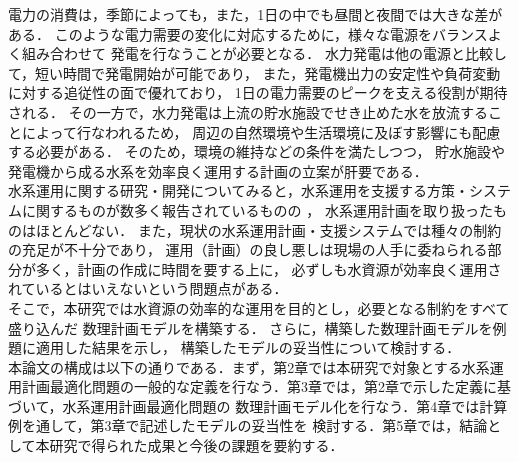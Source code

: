 電力の消費は，季節によっても，また，1日の中でも昼間と夜間では大きな差がある．
このような電力需要の変化に対応するために，様々な電源をバランスよく組み合わせて%
発電を行なうことが必要となる．
水力発電は他の電源と比較して，短い時間で発電開始が可能であり，%
また，発電機出力の安定性や負荷変動に対する追従性の面で優れており，%
1日の電力需要のピークを支える役割が期待される．
その一方で，水力発電は上流の貯水施設でせき止めた水を放流することによって行なわれるため，%
周辺の自然環境や生活環境に及ぼす影響にも配慮する必要がある．
そのため，環境の維持などの条件を満たしつつ，%
貯水施設や発電機から成る水系を効率良く運用する計画の立案が肝要である．\\
\indent
水系運用に関する研究・開発についてみると，水系運用を支援する方策・システムに関するものが数多く報告されているものの\cite{develop,method,alg} ，%
水系運用計画を取り扱ったものはほとんどない\cite{enhancement,dp}．
また，現状の水系運用計画・支援システムでは種々の制約の充足が不十分であり，%
運用（計画）の良し悪しは現場の人手に委ねられる部分が多く，計画の作成に時間を要する上に，%
必ずしも水資源が効率良く運用されているとはいえないという問題点がある．\\
\indent
そこで，本研究では水資源の効率的な運用を目的とし，必要となる制約をすべて盛り込んだ%
数理計画モデルを構築する．
さらに，構築した数理計画モデルを例題に適用した結果を示し，%
構築したモデルの妥当性について検討する．\\
\indent
本論文の構成は以下の通りである．まず，第2章では本研究で対象とする水系運用計画最適化問題の一般的な定義を行なう．第3章では，第2章で示した定義に基づいて，水系運用計画最適化問題の%
数理計画モデル化を行なう．第4章では計算例を通して，第3章で記述したモデルの妥当性を%
検討する．第5章では，結論として本研究で得られた成果と今後の課題を要約する．